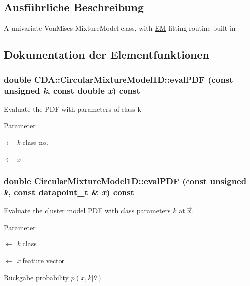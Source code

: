 \subsection{Ausführliche Beschreibung}
A univariate VonMises-\/MixtureModel class, with \hyperlink{classCDA_1_1EM}{EM} fitting routine built in 

\subsection{Dokumentation der Elementfunktionen}
\hypertarget{classCDA_1_1CircularMixtureModel1D_a5a138aadfa618e93c7f578752097363a}{
\subsubsection[{evalPDF}]{\setlength{\rightskip}{0pt plus 5cm}double CDA::CircularMixtureModel1D::evalPDF (const unsigned {\em k}, \/  const double {\em x}) const}}
\label{classCDA_1_1CircularMixtureModel1D_a5a138aadfa618e93c7f578752097363a}
Evaluate the PDF with parameters of class k


\begin{DoxyParams}{Parameter}
\item[\mbox{$\leftarrow$} {\em k}]class no. \item[\mbox{$\leftarrow$} {\em x}]\end{DoxyParams}
\hypertarget{classCDA_1_1CircularMixtureModel1D_a975b92938beb21d0233e5a52ff017dc5}{
\subsubsection[{evalPDF}]{\setlength{\rightskip}{0pt plus 5cm}double CircularMixtureModel1D::evalPDF (const unsigned {\em k}, \/  const datapoint\_\-t \& {\em x}) const}}
\label{classCDA_1_1CircularMixtureModel1D_a975b92938beb21d0233e5a52ff017dc5}


Evaluate the cluster model PDF with class parameters $k$ at $\vec{x}$. 


\begin{DoxyParams}{Parameter}
\item[\mbox{$\leftarrow$} {\em k}]class \item[\mbox{$\leftarrow$} {\em x}]feature vector\end{DoxyParams}
\begin{DoxyReturn}{Rückgabe}
probability $p(x,k\vert\theta)$ 
\end{DoxyReturn}



